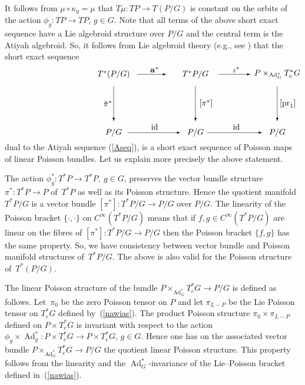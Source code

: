 \documentclass[pdftex]{sigma}
\renewcommand{\to}{\rightarrow}
\DeclareMathOperator{\Ad}{Ad}
\DeclareMathOperator{\anch}{\mathbf{a}}
\newcommand{\id}{\text{\upshape id}}
\numberwithin{equation}{section}
\begin{document}
It follows from $\mu\circ \kappa_g=\mu$ that $T\mu\colon TP\to T(P/G)$ is constant on the orbits of the action $\phi_g\colon TP\to TP$, $g\in G$. Note that all terms of the above short exact sequence have a Lie algebroid structure over $P/G$ and the central term is the Atiyah algebroid. So, it follows from Lie algebroid theory (e.g., see \cite[Chapter~3]{Mackenzie:GT}) that the short exact sequence
\begin{gather}\label{Adual}\begin{split}& \unitlength=5mm
\begin{picture}(11,5.6)(-4.5,0)
 \put(-2,5){\makebox(0,0){$T^* (P/G)$}}
 \put(5,5){\makebox(0,0){$ T^*P/G$}}
 \put(12,5){\makebox(0,0){$P\times_{\Ad_G^*}T^*_eG$}}
 \put(-2,0){\makebox(0,0){$P/G$}}
 \put(5,0){\makebox(0,0){$P/G$}}
 \put(12,0){\makebox(0,0){$P/G$}}
 \put(5,4){\vector(0,-1){3}}
 \put(-2,4){\vector(0,-1){3}}
 \put(12,4){\vector(0,-1){3}}
 \put(7,5){\vector(1,0){2.7}}
 \put(6,0){\vector(1,0){4.7}}
 \put(-0.8,0){\vector(1,0){4.5}}
 \put(0,5){\vector(1,0){2.5}}
 \put(-2.5,2.5){\makebox(0,0){$\tilde\pi^*$}}
 \put(5.9,2.5){\makebox(0,0){$[\pi^*]$}}
 \put(12.9,2.5){\makebox(0,0){$[\operatorname{pr}_1] $}}
 \put(8.5,5.4){\makebox(0,0){$\iota^* $}}
 \put(8.5,0.5){\makebox(0,0){$\id $}}
\put(1.5,0.5){\makebox(0,0){$ \id$}}
\put(1.5,5.4){\makebox(0,0){$\anch^* $}}
 \end{picture}\end{split}\end{gather}
dual to the Atiyah sequence (\ref{Aseq}), is a short exact sequence of Poisson maps of linear Poisson bundles. Let us explain more precisely the above statement.

The action $\phi_g^*\colon T^*P\to T^*P,\ g\in G$, preserves the vector bundle structure $\pi^*\colon T^*P\to P$ of~$T^*P$ as well as its Poisson structure. Hence the quotient manifold $T^*P/G$ is a vector bundle $[\pi^*]\colon T^*P/G\to P/G$ over $P/G$. The linearity of the Poisson bracket $\{\cdot,\cdot\}$ on $C^\infty(T^*P/G)$ means that if $f,g\in C^\infty(T^*P/G)$ are linear on the f\/ibres of $[\pi^*]\colon T^*P/G\to P/G$ then the Poisson bracket $\{f,g\}$ has the same property. So, we have consistency between vector bundle and Poisson manifold structures of~$T^*P/G$. The above is also valid for the Poisson structure of~$T^*(P/G)$.

The linear Poisson structure of the bundle $P\times_{\Ad_G^*} T_e^*G\to P/G$ is def\/ined as follows. Let~$\pi_0$ be the zero Poisson tensor on $P$ and let $\pi_{L-P}$ be the Lie Poisson tensor on $T_e^*G$ def\/ined by~(\ref{nawias}). The product Poisson structure $\pi_0\times \pi_{L-P}$ def\/ined on $P\times T^*_eG$ is invariant with respect to the action $\phi_g\times \Ad_g^*\colon P\times T^*_eG\to P\times T^*_eG$, $g\in G$. Hence one has on the associated vector bundle $P\times_{\Ad_G^*} T_e^*G\to P/G$ the quotient linear Poisson structure. This property follows from the linearity and the $\Ad^*_G$-invariance of the Lie--Poisson bracket def\/ined in~(\ref{nawias}).
\end{document}
